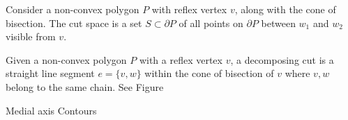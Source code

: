 \documentclass[../main.tex]{subfiles}
\begin{document}
\begin{definition}
\label{def:cut_space}
Consider a non-convex polygon $P$ with reflex vertex $v$, along with the cone of bisection. The cut space is a set $S\subset\partial P$ of all points on $\partial P$ between $w_1$ and $w_2$ visible from $v$.
\end{definition}

\begin{definition}
\label{def:decomposing_cut}
Given a non-convex polygon $P$ with a reflex vertex $v$, a decomposing cut is a straight line segment $e=\{v,w\}$ within the cone of bisection of $v$ where $v,w$ belong to the same chain. See Figure~%
\end{definition}

Medial axis
Contours
\end{document}
